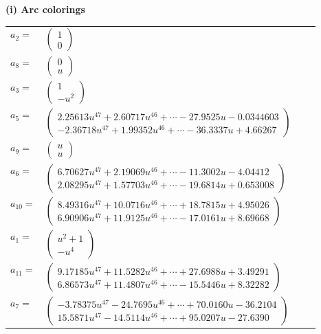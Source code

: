 \documentclass[1p]{elsarticle_modified}
\theoremstyle{definition}
\begin{document}
\flushleft \textbf{(i) Arc colorings}\\
\begin{tabular}{m{7pt} m{180pt} m{7pt} m{180pt} }
\flushright $a_{2}=$&$\begin{pmatrix}1\\0\end{pmatrix}$ \\
\flushright $a_{8}=$&$\begin{pmatrix}0\\u\end{pmatrix}$ \\
\flushright $a_{3}=$&$\begin{pmatrix}1\\- u^2\end{pmatrix}$ \\
\flushright $a_{5}=$&$\begin{pmatrix}2.25613 u^{47}+2.60717 u^{46}+\cdots-27.9525 u-0.0344603\\-2.36718 u^{47}+1.99352 u^{46}+\cdots-36.3337 u+4.66267\end{pmatrix}$ \\
\flushright $a_{9}=$&$\begin{pmatrix}u\\u\end{pmatrix}$ \\
\flushright $a_{6}=$&$\begin{pmatrix}6.70627 u^{47}+2.19069 u^{46}+\cdots-11.3002 u-4.04412\\2.08295 u^{47}+1.57703 u^{46}+\cdots-19.6814 u+0.653008\end{pmatrix}$ \\
\flushright $a_{10}=$&$\begin{pmatrix}8.49316 u^{47}+10.0716 u^{46}+\cdots+18.7815 u+4.95026\\6.90906 u^{47}+11.9125 u^{46}+\cdots-17.0161 u+8.69668\end{pmatrix}$ \\
\flushright $a_{1}=$&$\begin{pmatrix}u^2+1\\- u^4\end{pmatrix}$ \\
\flushright $a_{11}=$&$\begin{pmatrix}9.17185 u^{47}+11.5282 u^{46}+\cdots+27.6988 u+3.49291\\6.86573 u^{47}+11.4807 u^{46}+\cdots-15.5446 u+8.32282\end{pmatrix}$ \\
\flushright $a_{7}=$&$\begin{pmatrix}-3.78375 u^{47}-24.7695 u^{46}+\cdots+70.0160 u-36.2104\\15.5871 u^{47}-14.5114 u^{46}+\cdots+95.0207 u-27.6390\end{pmatrix}$ \\

\end{tabular}
\end{document}

